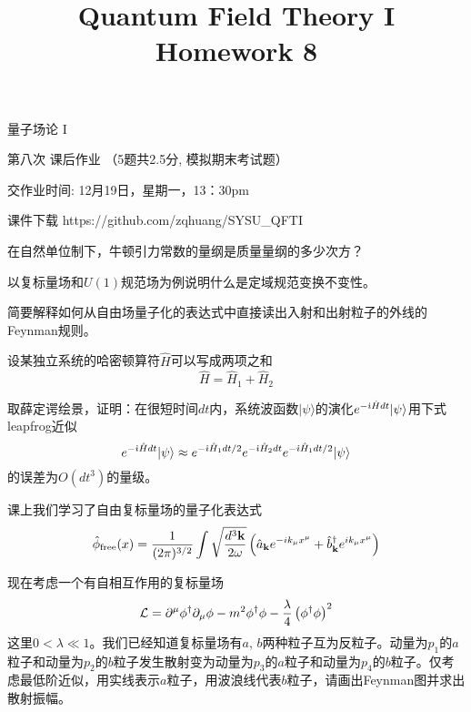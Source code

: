 \documentclass[CJK]{beamer}
\title{Quantum Field Theory I \\ Homework 8}
\author{}
\date{}
\begin{document}
\begin{frame}
 
\begin{center}
\begin{Large}
\bch
量子场论 I 

{\vskip 0.3in}

第八次 课后作业 （5题共2.5分, 模拟期末考试题）

交作业时间: 12月19日，星期一，13：30pm

\ech
\end{Large}
\end{center}

\vskip 0.2in

\bch
课件下载
\ech
https://github.com/zqhuang/SYSU\_QFTI

\end{frame}


\begin{frame}
\bch
在自然单位制下，牛顿引力常数的量纲是质量量纲的多少次方？
\ech
\end{frame}

\begin{frame}
\bch
以复标量场和$U(1)$规范场为例说明什么是定域规范变换不变性。
\ech
\end{frame}

\begin{frame}
\bch
简要解释如何从自由场量子化的表达式中直接读出入射和出射粒子的外线的Feynman规则。
\ech
\end{frame}


\begin{frame}
\bch
设某独立系统的哈密顿算符$\hat{H}$可以写成两项之和
$$\hat{H} = \hat{H}_1 + \hat{H}_2$$


取薛定谔绘景，证明：在很短时间$dt$内，系统波函数$|\psi\rangle$的演化$e^{-{\dot{\imath}} {\hat{H}} dt} |\psi\rangle$用下式leapfrog近似
$$ e^{-{\dot{\imath}} {\hat{H}} dt} |\psi \rangle  \approx e^{-{\dot{\imath}} {\hat{H}}_1 dt/2}e^{-{\dot{\imath}} {\hat{H}}_2 dt}e^{-{\dot{\imath}} {\hat{H}}_1 dt/2} | \psi \rangle $$
的误差为$O(dt^3)$的量级。

\ech
\end{frame}


\begin{frame}
\bch
{\small
课上我们学习了自由复标量场的量子化表达式
$${\hat{\phi}}_{\rm free}(x) = \frac{1}{(2\pi)^{3/2}} \int \sqrt{\frac{d^3{\mathbf{k}}}{2\omega}} \left({\hat{a}}_{{\mathbf{k}}} e^{-ik_\mu x^\mu} + {\hat{b}^\dagger}_{{\mathbf{k}}}e^{ik_\mu x^\mu}\right) $$

现在考虑一个有自相互作用的复标量场
$$ {\mathcal{L}} = \partial^\mu\phi^\dagger \partial_\mu \phi - m^2\phi^\dagger\phi - \frac{\lambda}{4}\left(\phi^\dagger\phi\right)^2$$
这里$0<\lambda\ll 1$。我们已经知道复标量场有$a$, $b$两种粒子互为反粒子。动量为$p_1$的$a$粒子和动量为$p_2$的$b$粒子发生散射变为动量为$p_3$的$a$粒子和动量为$p_4$的$b$粒子。仅考虑最低阶近似，用实线表示$a$粒子，用波浪线代表$b$粒子，请画出Feynman图并求出散射振幅。
}
\ech
\end{frame}
\end{document}
